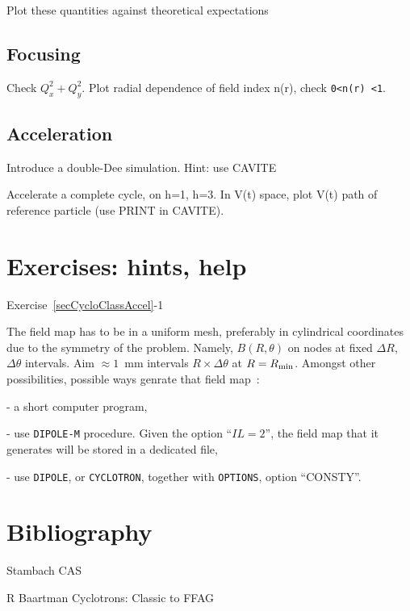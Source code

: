 Plot these quantities against theoretical expectations


\subsection{Focusing}

Check $Q_x^2 +Q_y^2$. Plot radial dependence of field index n(r), check \verb|0<n(r) <1|.


\subsection{Acceleration}

Introduce a double-Dee simulation. Hint: use CAVITE

Accelerate a complete cycle, on h=1, h=3. In V(t) space, plot V(t) path of reference particle (use PRINT in CAVITE). 






\section{Exercises: hints, help}

\noindent {\small $\bullet$} Exercise~\ref{secCycloClassAccel}-1 

The field map has to be in a uniform mesh, preferably in cylindrical coordinates due to the symmetry of the problem.
Namely, $B(R,\theta)$ on nodes at fixed $\Delta R$, $\Delta \theta$ intervals. Aim $\approx 1$~mm intervals 
$R\times \Delta \theta$ at $R=R_{\rm min}$. Amongst other possibilities, possible ways genrate that field map~: 

- a short computer program,

- use \texttt{DIPOLE-M} procedure. Given the option ``$IL=2$'', the field map that it generates will be stored in a dedicated file,

- use \texttt{DIPOLE}, or \texttt{CYCLOTRON}, together with \texttt{OPTIONS}, option ``CONSTY''.






\section{Bibliography \label{SecBiblioCyclotron}}

Stambach CAS

R Baartman Cyclotrons: Classic to FFAG

